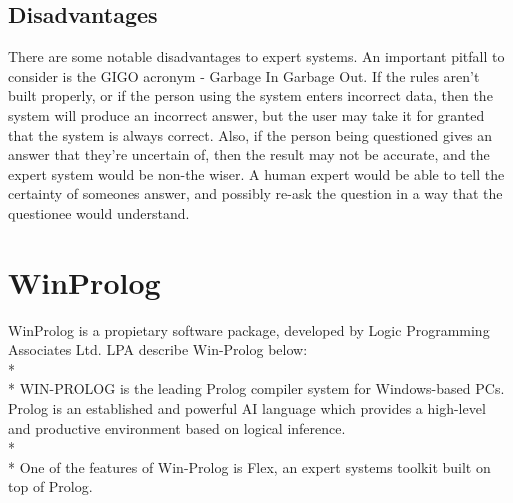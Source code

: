 \documentclass[12pt]{report}
\begin{document}
\subsection{Disadvantages}\label{subsec:disadvantages_expert_systems}
There are some notable disadvantages to expert systems.  An important pitfall to consider is the GIGO acronym - Garbage In Garbage Out.  If the rules aren't built properly, or if the person using the system enters incorrect data, then the system will produce an incorrect answer, but the user may take it for granted that the system is always correct.  Also, if the person being questioned gives an answer that they're uncertain of, then the result may not be accurate, and the expert system would be non-the wiser.  A human expert would be able to tell the certainty of someones answer, and possibly re-ask the question in a way that the questionee would understand.

\section{WinProlog}\label{sec:winprolog}
WinProlog is a propietary software package, developed by Logic Programming Associates Ltd.  LPA describe Win-Prolog below:
\\*
\\*
WIN-PROLOG is the leading Prolog compiler system for Windows-based PCs. Prolog is an established and powerful AI language which provides a high-level and productive environment based on logical inference.\citep{lpawinprolog}
\\*
\\*
One of the features of Win-Prolog is Flex, an expert systems toolkit built on top of Prolog.
\end{document}
